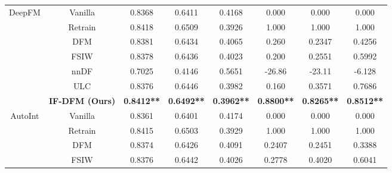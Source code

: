\begin{table*}[htbp]
\begin{tabular}{c|c|cccccc}
\multirow{7}{*}{{DeepFM}} & {Vanilla} & 0.8368                     & 0.6411                       & 0.4168                    & 0.000                         & 0.000                           & 0.000           \\
                         & {Retrain} & 0.8418                     & 0.6509                       & 0.3926                    & 1.000                         & 1.000                           & 1.000           \\ \cline{2-8} 
                         & {DFM}     & 0.8381                     & 0.6434                       & 0.4065                    & 0.260                         & 0.2347                          & 0.4256          \\
                         & {FSIW}    & 0.8378                     & 0.6436                       & 0.4023                    & 0.200                         & 0.2551                          & 0.5992          \\
                         & {nnDF}    & 0.7025                     & 0.4146                       & 0.5651                    & -26.86                        & -23.11                          & -6.128          \\
                         & {ULC}     & 0.8376                     & 0.6446                       & 0.3982                    & 0.160                         & 0.3571                          & 0.7686          \\
                         & \textbf{IF-DFM (Ours)}    & \textbf{0.8412**}            & \textbf{0.6492**}              & \textbf{0.3962**}           & \textbf{0.8800**}               & \textbf{0.8265**}                 & \textbf{0.8512**} \\ \midrule
\multirow{7}{*}{{AutoInt}} & {Vanilla} & 0.8361                     & 0.6401                       & 0.4174                    & 0.000                         & 0.000                           & 0.000           \\
                         & {Retrain} & 0.8415                     & 0.6503                       & 0.3929                    & 1.000                         & 1.000                           & 1.000           \\ \cline{2-8} 
                         & {DFM}     & 0.8374                     & 0.6426                       & 0.4091                    & 0.2407                        & 0.2451                          & 0.3388          \\
                         & {FSIW}    & 0.8376                     & 0.6442                       & 0.4026                    & 0.2778                        & 0.4020                          & 0.6041          \\

\end{tabular}
\end{table*}
